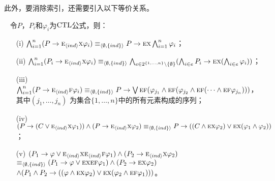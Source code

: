 此外，要消除索引，还需要引入以下等价关系。
\begin{lemma}~\label{lem:In2NI}
	令$P$，$P_i$和$\varphi_i$为$\textrm{CTL}$公式，则：
	\begin{itemize}
		\item[(i)] $\bigwedge_{i=1}^n (P\rightarrow \textsc{e}_{{\langle{ind}\rangle}} \textsc{x} \varphi_i)  \equiv_{{\langle{\emptyset, \{ind\}}\rangle}} P\rightarrow \textsc{e} \textsc{x} \bigwedge_{i=1}^n \varphi_i$；
		\item[(ii)]  $\bigwedge_{i=1}^n (P_i\rightarrow \textsc{e}_{{\langle{ind}\rangle}} \textsc{x} \varphi_i) \equiv_{{\langle{\emptyset, \{ind\}}\rangle}} \bigwedge_{e \in 2^{\{1,\dots, n\}} \setminus \{\emptyset\}}(\bigwedge_{i\in e}P_i\rightarrow \textsc{e} \textsc{x} (\bigwedge_{i\in e}\varphi_i))$；
		\item[(iii)]  $\bigwedge_{i=1}^n (P\rightarrow \textsc{e}_{{\langle{ind}\rangle}} \textsc{f} \varphi_i)  \equiv_{{\langle{\emptyset, \{ind\}}\rangle}} P\rightarrow \bigvee\textsc{e}\textsc{f} (\varphi_{j_1} \wedge \textsc{e}\textsc{f}(\varphi_{j_2} \wedge \textsc{e}\textsc{f}(\dots \wedge \textsc{e}\textsc{f} \varphi_{j_n})))$，其中$(j_1, \dots, j_n)$ 为集合$\{1, \dots, n\}$中的所有元素构成的序列；
		\item[(iv)]  $(P\rightarrow (C \vee \textsc{e}_{{\langle{ind}\rangle}} \textsc{x} \varphi_1)) \wedge (P \rightarrow \textsc{e}_{{\langle{ind}\rangle}} \textsc{x} \varphi_2) \equiv_{{\langle{\emptyset, \{ind\}}\rangle}} P \rightarrow ((C \wedge \textsc{e} \textsc{x} \varphi_2) \vee \textsc{e} \textsc{x} (\varphi_1 \wedge \varphi_2))$；
		\item[(v)]  $(P_1 \rightarrow \varphi \vee \textsc{e}_{{\langle{ind}\rangle}}\textsc{x} \textsc{e}_{{\langle{ind}\rangle}}\textsc{f} \varphi_1) \wedge (P_2 \rightarrow \textsc{e}_{{\langle{ind}\rangle}}\textsc{x} \varphi_2)$ $\equiv_{{\langle{\emptyset, \{ind\}}\rangle}} (P_1 \rightarrow \varphi \vee \textsc{e} \textsc{x} \textsc{e} \textsc{f} \varphi_1) \wedge (P_2 \rightarrow \textsc{e} \textsc{x} \varphi_2)$ $\wedge (P_1 \wedge P_2 \rightarrow ((\varphi \wedge \textsc{e} \textsc{x} \varphi_2) \vee \textsc{e} \textsc{x} (\varphi_2 \wedge \textsc{e} \textsc{f} \varphi_1)))$。
	\end{itemize}
\end{lemma}
